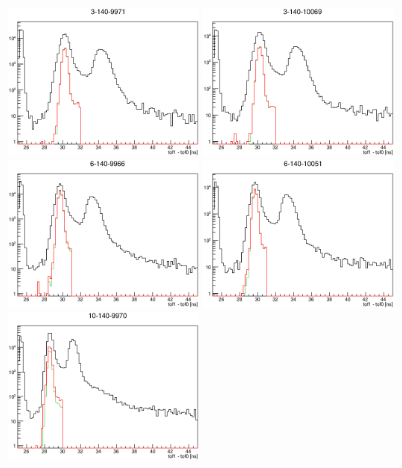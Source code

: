 \begin{figure}[!tbh]
    \centering
    \includegraphics*[width=0.45\textwidth]{analysis_plots/plots_3-140-full/tof01.eps}
    \includegraphics*[width=0.45\textwidth]{analysis_plots/plots_3-140-empty/tof01.eps}
    \includegraphics*[width=0.45\textwidth]{analysis_plots/plots_6-140-full/tof01.eps}
    \includegraphics*[width=0.45\textwidth]{analysis_plots/plots_6-140-empty/tof01.eps}
    \includegraphics*[width=0.45\textwidth]{analysis_plots/plots_10-140-full/tof01.eps}

\end{figure}

